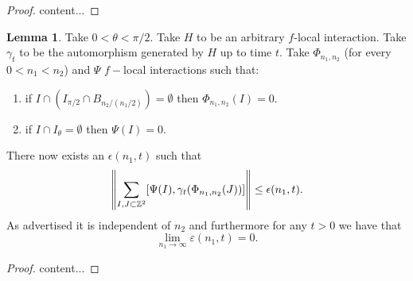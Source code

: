 \documentclass[12pt,a4paper,twoside]{article}
\newcommand{\ZZ}{\mathbb Z}
\theoremstyle{definition}
\newtheorem{lemma}[theorem]{Lemma}
\numberwithin{equation}{section}
\begin{document}
\begin{proof}
	content...
\end{proof}
\begin{lemma}
	Take $0<\theta<\pi/2$. Take $H$ to be an arbitrary $f$-local interaction. Take $\gamma_t$ to be the automorphism generated by $H$ up to time $t$. Take $\Phi_{n_1,n_2}$ (for every $0<n_1<n_2$) and $\Psi$ $f-$local interactions such that:
	\begin{enumerate}
		\item if $I\cap (I_{\pi/2}\cap B_{n_2/(n_1/2)})=\emptyset$ then $\Phi_{n_1,n_2}(I)=0.$
		\item if $I\cap I_{\theta}=\emptyset$ then $\Psi(I)=0.$
	\end{enumerate}
	There now exists an $\epsilon(n_1,t)$ such that
	\begin{equation}
		\norm{\sum_{I,J\subset\ZZ^2}[\Psi(I),\gamma_t(\Phi_{n_1,n_2}(J))]}\leq\epsilon(n_1,t).
	\end{equation}
	As advertised it is independent of $n_2$ and furthermore for any $t>0$ we have that
	\begin{equation}
		\lim_{n_1\rightarrow\infty}\varepsilon(n_1,t)=0.
	\end{equation}
\end{lemma}
\begin{proof}
	content...
\end{proof}


\end{document}
